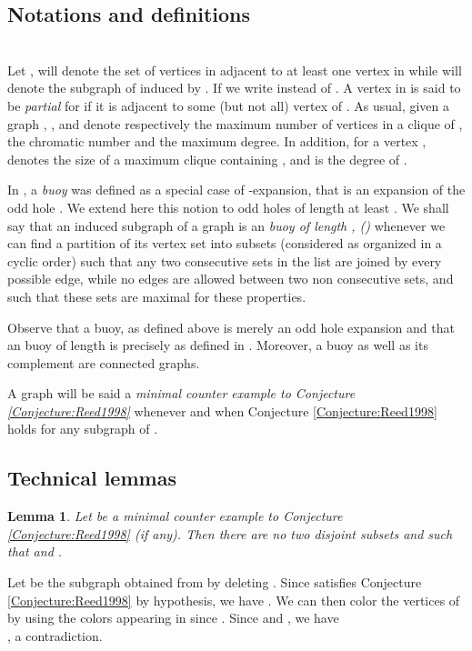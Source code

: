 \documentclass{amsart}
\newtheorem{lem}[thm]{Lemma}
\theoremstyle{definition}
\theoremstyle{remark}
\newenvironment{prf}{{\bf \noindent Proof. } }{\hfill\\}
\newcommand{\extB}{buoy\xspace}
\begin{document}
\subsection{Notations and definitions}
\\ 
Let ,  will denote the set of vertices in  adjacent to at least one vertex in  while  will denote the subgraph of  induced by . 
If  we write  instead of .
A vertex in  is said to be {\em partial} for  if it is adjacent to some (but not all) vertex of . 
As usual, given a graph , ,  and  denote respectively the maximum number of vertices in a clique of , the chromatic number and the maximum degree.
In addition, for a vertex ,  denotes the size of a maximum clique containing , and  is the degree of .



In \cite{FouGiaMaiThu1995}, a {\em buoy} was defined as a special case of -expansion, that is an expansion of the odd hole .
We extend here this notion to odd holes of length at least . We shall say that an induced subgraph of a graph  is an {\em \extB of length , ()} 
whenever we can find a partition of its vertex set into  subsets 
(considered as organized in a cyclic order) such that any two consecutive sets  in the list are joined by every
possible edge, while no edges are allowed between two non consecutive sets, and such that these sets are maximal for these properties. 

Observe that a \extB, as defined above is merely an odd hole expansion 
and that an \extB of length  is precisely as defined in \cite{FouGiaMaiThu1995}. Moreover, a \extB as well as its complement are connected graphs.

A graph  will be said a {\em minimal counter example to Conjecture \ref{Conjecture:Reed1998}} whenever  
and when Conjecture \ref{Conjecture:Reed1998} holds for any subgraph of .


\subsection{Technical lemmas}



\begin{lem}\label{Lemma:No_X_Y_minimum_cexemple}
Let  be a minimal counter example to Conjecture \ref{Conjecture:Reed1998} (if any). Then there are no two disjoint subsets  and   such that  
and .
\end{lem}


\begin{prf}
Let  be the subgraph obtained from   by deleting . Since  satisfies Conjecture \ref{Conjecture:Reed1998} by hypothesis, we have
. We can then color the vertices of  by using the colors appearing in  since .
Since  and , we have \\
, a contradiction.
\end{prf}
\end{document}
